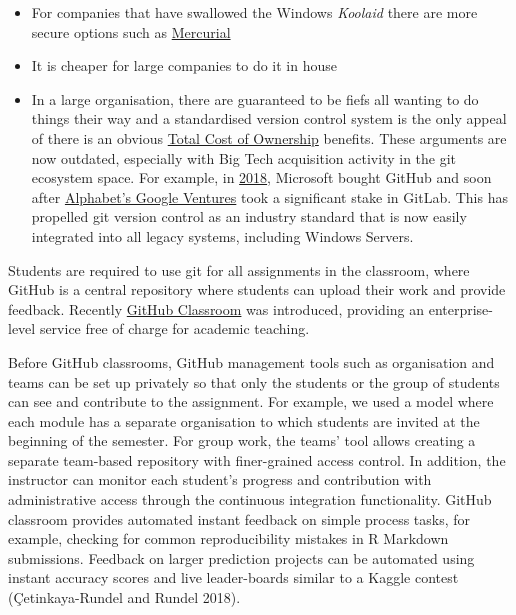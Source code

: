 \documentclass{article}
\providecommand{\tightlist}{%
  \setlength{\itemsep}{0pt}\setlength{\parskip}{0pt}}
\begin{document}
\begin{itemize}
\tightlist
\item
  For companies that have swallowed the Windows \emph{Koolaid} there are
  more secure options such as
  \href{https://www.mercurial-scm.org/}{Mercurial}
\item
  It is cheaper for large companies to do it in house
\item
  In a large organisation, there are guaranteed to be fiefs all wanting
  to do things their way and a standardised version control system is
  the only appeal of there is an obvious
  \href{https://www.investopedia.com/terms/t/totalcostofownership.asp}{Total
  Cost of Ownership} benefits. These arguments are now outdated,
  especially with Big Tech acquisition activity in the git ecosystem
  space. For example, in
  \href{https://www.bloomberg.com/news/articles/2018-06-03/microsoft-is-said-to-have-agreed-to-acquire-coding-site-github}{2018},
  Microsoft bought GitHub and soon after
  \href{https://www.bloomberg.com/news/articles/2018-09-19/alphabet-backs-gitlab-s-quest-to-surpass-microsoft-s-github}{Alphabet's
  Google Ventures} took a significant stake in GitLab. This has
  propelled git version control as an industry standard that is now
  easily integrated into all legacy systems, including Windows Servers.
\end{itemize}

Students are required to use git for all assignments in the classroom,
where GitHub is a central repository where students can upload their
work and provide feedback. Recently
\href{https://classroom.github.com/}{GitHub Classroom} was introduced,
providing an enterprise-level service free of charge for academic
teaching.

Before GitHub classrooms, GitHub management tools such as organisation
and teams can be set up privately so that only the students or the group
of students can see and contribute to the assignment. For example, we
used a model where each module has a separate organisation to which
students are invited at the beginning of the semester. For group work,
the teams' tool allows creating a separate team-based repository with
finer-grained access control. In addition, the instructor can monitor
each student's progress and contribution with administrative access
through the continuous integration functionality. GitHub classroom
provides automated instant feedback on simple process tasks, for
example, checking for common reproducibility mistakes in R Markdown
submissions. Feedback on larger prediction projects can be automated
using instant accuracy scores and live leader-boards similar to a Kaggle
contest (Çetinkaya-Rundel and Rundel 2018).
\end{document}
